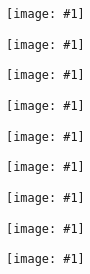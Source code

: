 \documentclass[english, 12 pt]{report}
\newcommand{\fig}[1]{
\begin{figure}[h]
	\texttt{[image: \#1]}
	\centering
\end{figure}
\newpage
}
\begin{document}
\pagestyle{empty}
\fig{fig1}
\fig{fig2}
\fig{fig3}
\fig{fig4}
\fig{fig5}
\fig{fig6}
\fig{fig7}
\fig{fig8}
\fig{fig9}
\end{document}
